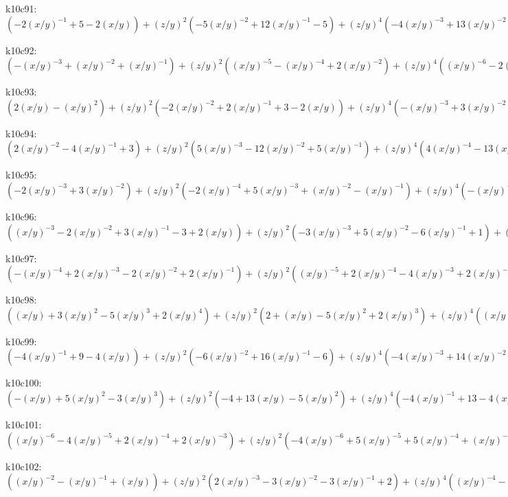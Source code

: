 k10c91: $ (-2(x/y)^{-1}+5-2(x/y))  +(z/y)^{2}(-5(x/y)^{-2}+12(x/y)^{-1}-5)  +(z/y)^{4}(-4(x/y)^{-3}+13(x/y)^{-2}-4(x/y)^{-1})  +(z/y)^{6}(-(x/y)^{-4}+6(x/y)^{-3}-(x/y)^{-2})  +(x/y)^{-4}(z/y)^{8} $ 

k10c92: $ (-(x/y)^{-3}+(x/y)^{-2}+(x/y)^{-1})  +(z/y)^{2}((x/y)^{-5}-(x/y)^{-4}+2(x/y)^{-2})  +(z/y)^{4}((x/y)^{-6}-2(x/y)^{-5}-2(x/y)^{-4}+(x/y)^{-3})  +(z/y)^{6}(-(x/y)^{-6}-(x/y)^{-5}) $ 

k10c93: $ (2(x/y)-(x/y)^{2})  +(z/y)^{2}(-2(x/y)^{-2}+2(x/y)^{-1}+3-2(x/y))  +(z/y)^{4}(-(x/y)^{-3}+3(x/y)^{-2}+3(x/y)^{-1}-1)  +(z/y)^{6}((x/y)^{-3}+(x/y)^{-2}) $ 

k10c94: $ (2(x/y)^{-2}-4(x/y)^{-1}+3)  +(z/y)^{2}(5(x/y)^{-3}-12(x/y)^{-2}+5(x/y)^{-1})  +(z/y)^{4}(4(x/y)^{-4}-13(x/y)^{-3}+4(x/y)^{-2})  +(z/y)^{6}((x/y)^{-5}-6(x/y)^{-4}+(x/y)^{-3})  -(x/y)^{-5}(z/y)^{8} $ 

k10c95: $ (-2(x/y)^{-3}+3(x/y)^{-2})  +(z/y)^{2}(-2(x/y)^{-4}+5(x/y)^{-3}+(x/y)^{-2}-(x/y)^{-1})  +(z/y)^{4}(-(x/y)^{-5}+3(x/y)^{-4}+2(x/y)^{-3}-(x/y)^{-2})  +(z/y)^{6}((x/y)^{-5}+(x/y)^{-4}) $ 

k10c96: $ ((x/y)^{-3}-2(x/y)^{-2}+3(x/y)^{-1}-3+2(x/y))  +(z/y)^{2}(-3(x/y)^{-3}+5(x/y)^{-2}-6(x/y)^{-1}+1)  +(z/y)^{4}(3(x/y)^{-3}-3(x/y)^{-2}+(x/y)^{-1})  -(x/y)^{-3}(z/y)^{6} $ 

k10c97: $ (-(x/y)^{-4}+2(x/y)^{-3}-2(x/y)^{-2}+2(x/y)^{-1})  +(z/y)^{2}((x/y)^{-5}+2(x/y)^{-4}-4(x/y)^{-3}+2(x/y)^{-2}+(x/y)^{-1})  +(z/y)^{4}(-(x/y)^{-5}-3(x/y)^{-4}-(x/y)^{-3}) $ 

k10c98: $ ((x/y)+3(x/y)^{2}-5(x/y)^{3}+2(x/y)^{4})  +(z/y)^{2}(2+(x/y)-5(x/y)^{2}+2(x/y)^{3})  +(z/y)^{4}((x/y)^{-1}-2-3(x/y)+(x/y)^{2})  +(z/y)^{6}(-(x/y)^{-1}-1) $ 

k10c99: $ (-4(x/y)^{-1}+9-4(x/y))  +(z/y)^{2}(-6(x/y)^{-2}+16(x/y)^{-1}-6)  +(z/y)^{4}(-4(x/y)^{-3}+14(x/y)^{-2}-4(x/y)^{-1})  +(z/y)^{6}(-(x/y)^{-4}+6(x/y)^{-3}-(x/y)^{-2})  +(x/y)^{-4}(z/y)^{8} $ 

k10c100: $ (-(x/y)+5(x/y)^{2}-3(x/y)^{3})  +(z/y)^{2}(-4+13(x/y)-5(x/y)^{2})  +(z/y)^{4}(-4(x/y)^{-1}+13-4(x/y))  +(z/y)^{6}(-(x/y)^{-2}+6(x/y)^{-1}-1)  +(x/y)^{-2}(z/y)^{8} $ 

k10c101: $ ((x/y)^{-6}-4(x/y)^{-5}+2(x/y)^{-4}+2(x/y)^{-3})  +(z/y)^{2}(-4(x/y)^{-6}+5(x/y)^{-5}+5(x/y)^{-4}+(x/y)^{-3})  +(z/y)^{4}(3(x/y)^{-6}+3(x/y)^{-5}+(x/y)^{-4}) $ 

k10c102: $ ((x/y)^{-2}-(x/y)^{-1}+(x/y))  +(z/y)^{2}(2(x/y)^{-3}-3(x/y)^{-2}-3(x/y)^{-1}+2)  +(z/y)^{4}((x/y)^{-4}-3(x/y)^{-3}-3(x/y)^{-2}+(x/y)^{-1})  +(z/y)^{6}(-(x/y)^{-4}-(x/y)^{-3}) $ 

